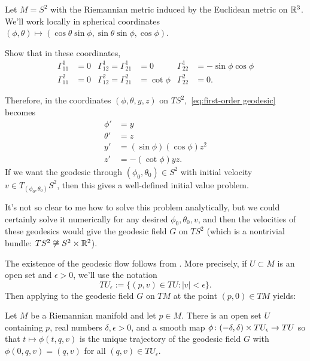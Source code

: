 \begin{example}
	Let $M = S^2$ with the Riemannian metric induced by the Euclidean metric on $\mathbb{R}^3$. We'll work locally in spherical coordinates $(\phi,\theta) \mapsto (\cos \theta \sin \phi, \sin \theta \sin \phi, \cos \phi)$. 
	
	\begin{exercise}
		Show that in these coordinates,
		\begin{align*}
			\Gamma_{11}^1 & = 0 & \Gamma_{12}^1 = \Gamma_{21}^1 & = 0 &  \Gamma_{22}^1 & = -\sin \phi \cos \phi \\
			\Gamma_{11}^2 & = 0 & \Gamma_{12}^2 = \Gamma_{21}^2 & = \cot \phi & \Gamma_{22}^2 & = 0.
		\end{align*}
	\end{exercise}
	
	Therefore, in the coordinates $(\phi, \theta, y, z)$ on $TS^2$,~\eqref{eq:first-order geodesic} becomes
	\begin{align*}
		\phi' & = y \\
		\theta' & = z \\
		y' & = (\sin \phi) (\cos \phi) z^2 \\
		z' & = - (\cot \phi) y z.
	\end{align*}
	If we want the geodesic through $(\phi_0,\theta_0) \in S^2$ with initial velocity $v \in T_{(\phi_0,\theta_0)}S^2$, then this gives a well-defined initial value problem.
	
	It's not so clear to me how to solve this problem analytically, but we could certainly solve it numerically for any desired $\phi_0,\theta_0,v$, and then the velocities of these geodesics would give the geodesic field $G$ on $TS^2$ (which is a nontrivial bundle: $TS^2 \not\cong S^2 \times \mathbb{R}^2$).
\end{example}

The existence of the geodesic flow follows from . More precisely, if $U \subset M$ is an open set and $\epsilon > 0$, we'll use the notation
\[
	TU_\epsilon := \{(p,v) \in TU : |v|<\epsilon\}.
\]
Then applying  to the geodesic field $G$ on $TM$ at the point $(p,0) \in TM$ yields:
\begin{proposition}\label{prop:geodesic flow}
	Let $M$ be a Riemannian manifold and let $p \in M$. There is an open set $U$ containing $p$, real numbers $\delta,\epsilon > 0$, and a smooth map $\phi \colon\thinspace\! (-\delta, \delta) \times TU_\epsilon \to TU$ so that $t \mapsto \phi(t,q,v)$ is the unique trajectory of the geodesic field $G$ with $\phi(0,q,v) = (q,v)$ for all $(q,v) \in TU_\epsilon$.
\end{proposition}

